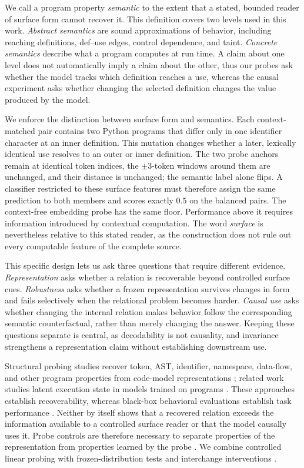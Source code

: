 \documentclass{article}
\begin{document}
We call a program property \emph{semantic} to the extent that a stated, bounded reader of surface form cannot recover it. This definition covers two levels used in this work. \emph{Abstract semantics} are sound approximations of behavior, including reaching definitions, def--use edges, control dependence, and taint. \emph{Concrete semantics} describe what a program computes at run time. A claim about one level does not automatically imply a claim about the other, thus our probes ask whether the model tracks which definition reaches a use, whereas the causal experiment asks whether changing the selected definition changes the value produced by the model.

We enforce the distinction between surface form and semantics. Each context-matched pair contains two Python programs that differ only in one identifier character at an inner definition. This mutation changes whether a later, lexically identical use resolves to an outer or inner definition. The two probe anchors remain at identical token indices, the $\pm3$-token windows around them are unchanged, and their distance is unchanged; the semantic label alone flips. A classifier restricted to these surface features must therefore assign the same prediction to both members and scores exactly $0.5$ on the balanced pairs. The context-free embedding probe has the same floor. Performance above it requires information introduced by contextual computation. The word \emph{surface} is nevertheless relative to this stated reader, as the construction does not rule out every computable feature of the complete source.

This specific design lets us ask three questions that require different evidence. \emph{Representation} asks whether a relation is recoverable beyond controlled surface cues. \emph{Robustness} asks whether a frozen representation survives changes in form and fails selectively when the relational problem becomes harder. \emph{Causal use} asks whether changing the internal relation makes behavior follow the corresponding semantic counterfactual, rather than merely changing the answer. Keeping these questions separate is central, as decodability is not causality, and invariance strengthens a representation claim without establishing downstream use.

Structural probing studies recover token, AST, identifier, namespace, data-flow, and other program properties from code-model representations \citep{wan2022capture,hernandez2022astprobe,troshin2022probing,ma2024unveiling}; related work studies latent execution state in models trained on programs \citep{jin2024emergent}. These approaches establish recoverability, whereas black-box behavioral evaluations establish task performance \citep{XX}. Neither by itself shows that a recovered relation exceeds the information available to a controlled surface reader or that the model causally uses it. Probe controls are therefore necessary to separate properties of the representation from properties learned by the probe \citep{hewitt2019control}. We combine controlled linear probing with frozen-distribution tests and interchange interventions \citep{geiger2023alignments,wu2023boundless,huang2024ravel}.
\end{document}

